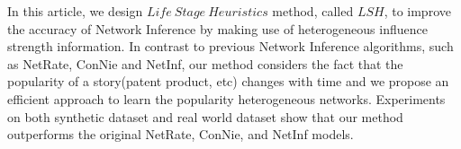In this article, we design $Life~ Stage~Heuristics$ method, called $LSH$, to improve the accuracy of Network Inference by making use of heterogeneous influence strength information. In contrast to previous Network Inference algorithms, such as NetRate, ConNie and NetInf, our method considers the fact that the popularity of a story(patent product, etc) changes with time and we propose an efficient approach to learn the popularity heterogeneous networks. Experiments on both synthetic dataset and real world dataset show that our method outperforms the original NetRate, ConNie, and NetInf models. 